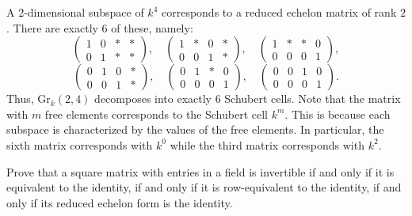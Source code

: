 \documentclass[../../master.tex]{subfiles}
\begin{document}
\begin{solution}
    A 2-dimensional subspace of $k^{4}$ corresponds to a reduced echelon matrix of rank $2$.
    There are exactly 6 of these, namely:
    \[
        \begin{pmatrix}
            1 & 0 & * & * \\
            0 & 1 & * & *
        \end{pmatrix},
        \quad
        \begin{pmatrix}
            1 & * & 0 & * \\
            0 & 0 & 1 & *
        \end{pmatrix},
        \quad
        \begin{pmatrix}
            1 & * & * & 0 \\
            0 & 0 & 0 & 1
        \end{pmatrix},
    \]
    \[
        \begin{pmatrix}
            0 & 1 & 0 & * \\
            0 & 0 & 1 & *
        \end{pmatrix},
        \quad
        \begin{pmatrix}
            0 & 1 & * & 0 \\
            0 & 0 & 0 & 1
        \end{pmatrix},
        \quad
        \begin{pmatrix}
            0 & 0 & 1 & 0 \\
            0 & 0 & 0 & 1
        \end{pmatrix}.
    \]
    Thus, $\text{Gr}_k(2, 4)$ decomposes into exactly 6 Schubert cells.
    Note that the matrix with $m$ free elements corresponds to the Schubert cell $k^{m}$.
    This is because each subspace is characterized by the values of the free elements.
    In particular, the sixth matrix corresponds with $k^{0}$ while the third matrix corresponds with $k^2$.
\end{solution}

\begin{problem}
    Prove that a square matrix with entries in a field is invertible if and only if it is equivalent to the identity, if and only if it is row-equivalent to the identity, if and only if its reduced echelon form is the identity.
\end{problem}
\end{document}
